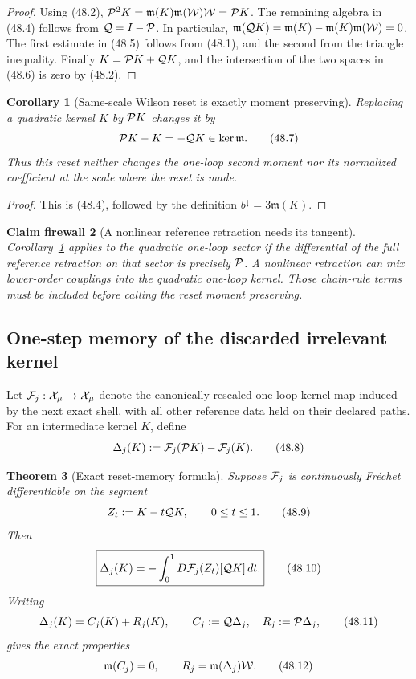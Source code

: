 \documentclass[11pt,oneside]{book}
\newtheorem{theorem}{Theorem}[chapter]
\newtheorem{corollary}[theorem]{Corollary}
\newtheorem{firewall}[theorem]{Claim firewall}
\theoremstyle{definition}
\theoremstyle{remark}
\begin{document}
\begin{proof}
Using (48.2),
\({\cal P}^2K={\mathfrak m}(K){\mathfrak m}({\cal W}){\cal W}
={\cal P}K\).  The remaining algebra in (48.4) follows from
\({\cal Q}=I-{\cal P}\).  In particular,
\({\mathfrak m}({\cal Q}K)
={\mathfrak m}(K)-{\mathfrak m}(K){\mathfrak m}({\cal W})=0\).
The first estimate in (48.5) follows from (48.1), and the second
from the triangle inequality.  Finally
\(K={\cal P}K+{\cal Q}K\), and the intersection of the two spaces
in (48.6) is zero by (48.2).
\end{proof}

\begin{corollary}[Same-scale Wilson reset is exactly moment
preserving]
\label{cor:e8v48-same-scale}
Replacing a quadratic kernel \(K\) by \({\cal P}K\) changes it by
\[
 {\cal P}K-K=-{\cal Q}K\in\ker{\mathfrak m}.                  \tag{48.7}
\]
Thus this reset neither changes the one-loop second moment nor its
normalized coefficient at the scale where the reset is made.
\end{corollary}

\begin{proof}
This is (48.4), followed by the definition
\(b^\downarrow=3{\mathfrak m}(K)\).
\end{proof}

\begin{firewall}[A nonlinear reference retraction needs its tangent]
\label{fire:e8v48-nonlinear-reset}
Corollary~\ref{cor:e8v48-same-scale} applies to the quadratic
one-loop sector if the differential of the full reference
retraction on that sector is precisely \({\cal P}\).  A nonlinear
retraction can mix lower-order couplings into the quadratic
one-loop kernel.  Those chain-rule terms must be included before
calling the reset moment preserving.
\end{firewall}

\subsection{One-step memory of the discarded irrelevant kernel}

Let \({\cal F}_j:{\cal X}_\mu\to{\cal X}_\mu\) denote the
canonically rescaled one-loop kernel map induced by the next exact
shell, with all other reference data held on their declared paths.
For an intermediate kernel \(K\), define
\[
 \Delta_j(K):={\cal F}_j({\cal P}K)-{\cal F}_j(K).             \tag{48.8}
\]

\begin{theorem}[Exact reset-memory formula]
\label{thm:e8v48-reset-memory}
Suppose \({\cal F}_j\) is continuously Fréchet differentiable on
the segment
\[
 Z_t:=K-t{\cal Q}K,\qquad0\le t\le1.                          \tag{48.9}
\]
Then
\[
 \boxed{\Delta_j(K)
 =-\int_0^1D{\cal F}_j(Z_t)[{\cal Q}K]\,dt.}                  \tag{48.10}
\]
Writing
\[
 \Delta_j(K)=C_j(K)+R_j(K),\qquad
 C_j:={\cal Q}\Delta_j,\quad R_j:={\cal P}\Delta_j,           \tag{48.11}
\]
gives the exact properties
\[
 {\mathfrak m}(C_j)=0,\qquad
 R_j={\mathfrak m}(\Delta_j){\cal W}.                         \tag{48.12}
\]
\end{theorem}
\end{document}
